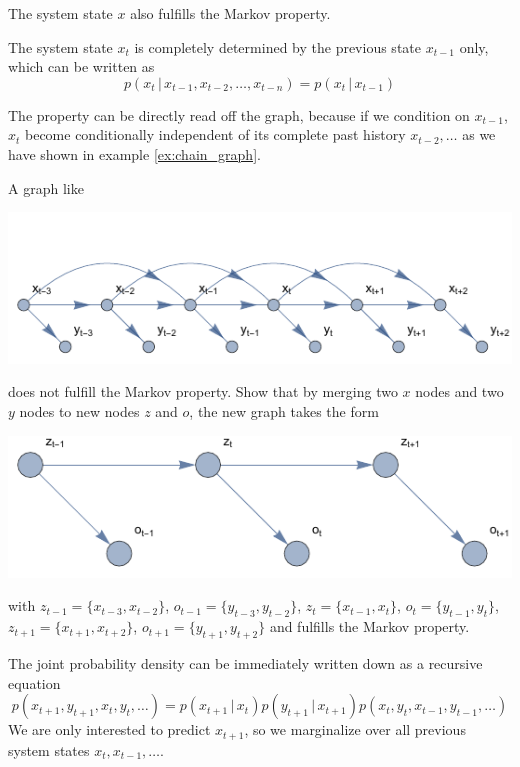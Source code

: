 \documentclass{tstextbook}
\begin{document}
The system state $x$ also fulfills the Markov property.

\begin{definition}
  \label{th:markovproperty}
  The system state $x_t$ is completely determined by the previous state $x_{t-1}$ only, which can be written as
\begin{equation}
p(x_t\,\vert\, x_{t-1},x_{t-2},\ldots,x_{t-n})=p(x_t\,\vert\, x_{t-1})
\end{equation}
\end{definition} 
The property can be directly read off the graph, because if we condition on $x_{t-1}$, $x_t$ become conditionally independent of its complete past history $x_{t-2},\ldots$ as we have shown in example \ref{ex:chain_graph}.

\begin{exercise}
A graph like

\includegraphics[scale=1.2, center]{images/non_markov_graph.pdf}

does not fulfill the Markov property. Show that by merging two $x$ nodes and two $y$ nodes to new nodes $z$ and $o$, the new graph takes the form

\includegraphics[scale=1.0, center]{images/markov_graph.pdf}

with $z_{t-1}=\{x_{t-3},x_{t-2}\}$, $o_{t-1}=\{y_{t-3},y_{t-2}\}$, $z_t=\{x_{t-1},x_t\}$, $o_t=\{y_{t-1},y_t\}$, $z_{t+1}=\{x_{t+1},x_{t+2}\}$, $o_{t+1}=\{y_{t+1},y_{t+2}\}$ and fulfills the Markov property.  
\end{exercise}


The joint probability density can be immediately written down as a recursive equation
\begin{equation}
p(x_{t+1},y_{t+1},x_{t},y_{t},\ldots)=p(x_{t+1}\,\vert\, x_{t})p(y_{t+1}\,\vert\, x_{t+1})p(x_{t},y_{t},x_{t-1},y_{t-1},\ldots)
\end{equation}
We are only interested to predict $x_{t+1}$, so we marginalize over all previous system states $x_{t},x_{t-1},\ldots$.
\end{document}

